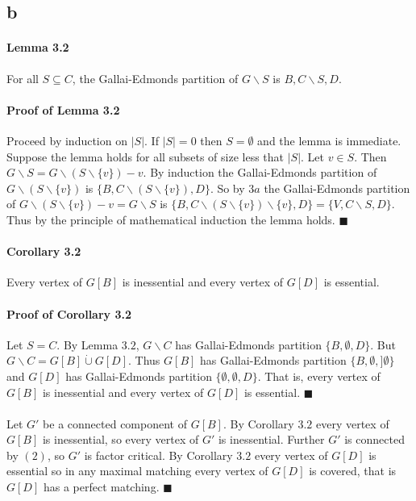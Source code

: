\documentclass[letterpaper,12pt,oneside,onecolumn]{report}
\begin{document}
\subsection*{b}
\paragraph{Lemma 3.2}
For all $S \subseteq C$, the Gallai-Edmonds partition of $G\backslash S$ is $B, C\backslash S, D$.
\paragraph{Proof of Lemma 3.2}
Proceed by induction on $|S|$. If $|S|  = 0$ then $S = \emptyset$ and the lemma is immediate. Suppose the lemma holds for all subsets of size less that $|S|$. Let $v \in S$. Then $G\backslash S = G\backslash (S \backslash \{v\}) - v$. By induction the Gallai-Edmonds partition of $G\backslash (S\backslash \{v\})$ is $\{B, C\backslash (S\backslash \{v\}), D \}$. So by $3a$ the Gallai-Edmonds partition of $G\backslash (S \backslash \{v\}) - v = G\backslash S$ is $\{B, C\backslash (S\backslash \{v\})\backslash \{v\}, D\} = \{V, C\backslash S, D\}$. Thus by the principle of mathematical induction the lemma holds. $\blacksquare$
\paragraph{Corollary 3.2}
Every vertex of $G[B]$ is inessential and every vertex of $G[D]$ is essential.
\paragraph{Proof of Corollary 3.2}
Let $S = C$. By Lemma $3.2$, $G\backslash C$ has Gallai-Edmonds partition $\{B, \emptyset, D\}$. But $G \backslash C = G[B] \dot \cup G[D]$. Thus $G[B]$ has Gallai-Edmonds partition $\{B, \emptyset, ]\emptyset\}$ and $G[D]$ has Gallai-Edmonds partition $\{\emptyset, \emptyset, D\}$. That is, every vertex of $G[B]$ is inessential and every vertex of $G[D]$ is essential. $\blacksquare$
\paragraph{}
Let $G'$ be a connected component of $G[B]$. By Corollary $3.2$ every vertex of $G[B]$ is inessential, so every vertex of $G'$ is inessential. Further $G'$ is connected by $(2)$, so $G'$ is factor critical. By Corollary $3.2$ every vertex of $G[D]$ is essential so in any maximal matching every vertex of $G[D]$ is covered, that is $G[D]$ has a perfect matching. $\blacksquare$
\end{document}
